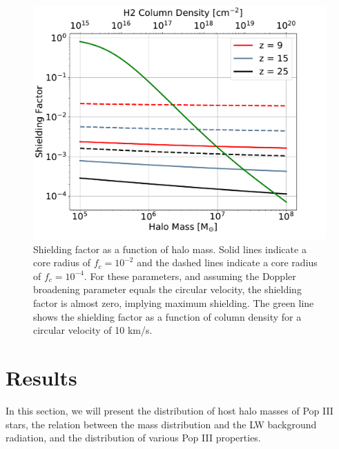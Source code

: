 \documentclass[a4paper,fleqn,usenatbib]{mnras}
\begin{document}
\begin{figure}
	\includegraphics[width=\columnwidth]{images/shield_mass.pdf}
    \caption{Shielding factor as a function of halo mass. Solid lines indicate a core radius of $f_{c} = 10^{-2}$ and the dashed lines indicate a core radius of $f_{c} = 10^{-4}$. For these parameters, and assuming the Doppler broadening parameter equals the circular velocity, the shielding factor is almost zero, implying maximum shielding. The green line shows the shielding factor as a function of \hh{} column density for a circular velocity of 10 km/s. }
    \label{fig:shield_mass}
\end{figure}
\section{Results}
In this section, we will present the distribution of host halo masses of Pop III stars, the relation between the mass distribution and the LW background radiation, and the distribution of various Pop III properties.
\end{document}
